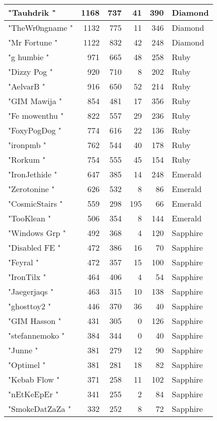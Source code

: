 \documentclass{article}
\begin{document}
\begin{table}[htbp]
\begin{tabular}{|l|r|r|r|r|l|}
"Tauhdrik " & 1168 & 737 & 41 & 390 & Diamond \\ \hline
"TheWr0ngname " & 1132 & 775 & 11 & 346 & Diamond \\ \hline
"Mr Fortune " & 1122 & 832 & 42 & 248 & Diamond \\ \hline
"g humbie " & 971 & 665 & 48 & 258 & Ruby \\ \hline
"Dizzy Pog " & 920 & 710 & 8 & 202 & Ruby \\ \hline
"AelvarB " & 916 & 650 & 52 & 214 & Ruby \\ \hline
"GIM Mawija " & 854 & 481 & 17 & 356 & Ruby \\ \hline
"Fe mowenthu " & 822 & 557 & 29 & 236 & Ruby \\ \hline
"FoxyPogDog " & 774 & 616 & 22 & 136 & Ruby \\ \hline
"ironpmb " & 762 & 544 & 40 & 178 & Ruby \\ \hline
"Rorkum " & 754 & 555 & 45 & 154 & Ruby \\ \hline
"IronJethide " & 647 & 385 & 14 & 248 & Emerald \\ \hline
"Zerotonine " & 626 & 532 & 8 & 86 & Emerald \\ \hline
"CosmicStairs " & 559 & 298 & 195 & 66 & Emerald \\ \hline
"TooKlean " & 506 & 354 & 8 & 144 & Emerald \\ \hline
"Windows Grp " & 492 & 368 & 4 & 120 & Sapphire \\ \hline
"Disabled FE " & 472 & 386 & 16 & 70 & Sapphire \\ \hline
"Feyral " & 472 & 357 & 15 & 100 & Sapphire \\ \hline
"IronTilx " & 464 & 406 & 4 & 54 & Sapphire \\ \hline
"Jaegerjaqs " & 463 & 315 & 10 & 138 & Sapphire \\ \hline
"ghosttoy2 " & 446 & 370 & 36 & 40 & Sapphire \\ \hline
"GIM Hasson " & 431 & 305 & 0 & 126 & Sapphire \\ \hline
"stefannemoko " & 384 & 344 & 0 & 40 & Sapphire \\ \hline
"Junne " & 381 & 279 & 12 & 90 & Sapphire \\ \hline
"Optimel " & 381 & 281 & 18 & 82 & Sapphire \\ \hline
"Kebab Flow " & 371 & 258 & 11 & 102 & Sapphire \\ \hline
"nEtKeEpEr " & 341 & 255 & 2 & 84 & Sapphire \\ \hline
"SmokeDatZaZa " & 332 & 252 & 8 & 72 & Sapphire \\ \hline

\end{tabular}
\end{table}
\end{document}
